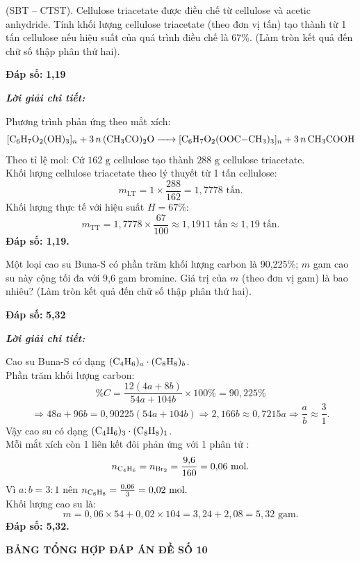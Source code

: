 \documentclass[11pt,a4paper]{article}
\def\loigiai#1{
\par\begingroup\color{blue!80!black}\small
\noindent\textbf{\textit{Lời giải chi tiết:}}\par
#1\par\endgroup}
\begin{document}
\begin{ex}
(SBT -- CTST). Cellulose triacetate được điều chế từ cellulose và acetic anhydride. Tính khối lượng cellulose triacetate (theo đơn vị tấn) tạo thành từ 1 tấn cellulose nếu hiệu suất của quá trình điều chế là 67\%. (Làm tròn kết quả đến chữ số thập phân thứ hai).
\par\noindent\textbf{Đáp số:} \textbf{\color{red}1,19}
\loigiai{
Phương trình phản ứng theo mắt xích:
$$\ce{[C6H7O2(OH)3]_n + 3n (CH3CO)2O -> [C6H7O2(OOC-CH3)3]_n + 3n CH3COOH}$$
Theo tỉ lệ mol: Cứ $162\text{ g}$ cellulose tạo thành $288\text{ g}$ cellulose triacetate.\\
Khối lượng cellulose triacetate theo lý thuyết từ 1 tấn cellulose:
$$m_{\text{LT}} = 1 \times \frac{288}{162} = 1{,}7778\text{ tấn.}$$
Khối lượng thực tế với hiệu suất $H = 67\%$:
$$m_{\text{TT}} = 1{,}7778 \times \frac{67}{100} \approx 1{,}1911\text{ tấn} \approx 1{,}19\text{ tấn.}$$
\textbf{Đáp số: 1,19.}}
\end{ex}

\begin{ex}
Một loại cao su Buna-S có phần trăm khối lượng carbon là 90,225\%; $m$ gam cao su này cộng tối đa với 9,6 gam bromine. Giá trị của $m$ (theo đơn vị gam) là bao nhiêu? (Làm tròn kết quả đến chữ số thập phân thứ hai).
\par\noindent\textbf{Đáp số:} \textbf{\color{red}5,32}
\loigiai{
Cao su Buna-S có dạng $()_a \cdot (\ce{C8H8})_b$.\\
Phần trăm khối lượng carbon:
$$\%C = \frac{12(4a + 8b)}{54a + 104b} \times 100\% = 90{,}225\%$$
$$\Rightarrow 48a + 96b = 0{,}90225(54a + 104b) \Rightarrow 2{,}166b \approx 0{,}7215a \Rightarrow \frac{a}{b} \approx \frac{3}{1}.$$
Vậy cao su có dạng $(\ce{C4H6})_3 \cdot (\ce{C8H8})_1$.\\
Mỗi mắt xích \ce{C4H6} còn 1 liên kết đôi \ce{C=C} phản ứng với 1 phân tử \ce{Br2}:
$$n_{\ce{C4H6}} = n_{\ce{Br2}} = \frac{9{,}6}{160} = 0{,}06\text{ mol.}$$
Vì $a : b = 3 : 1$ nên $n_{\ce{C8H8}} = \frac{0{,}06}{3} = 0{,}02\text{ mol.}$\\
Khối lượng cao su là:
$$m = 0{,}06 \times 54 + 0{,}02 \times 104 = 3{,}24 + 2{,}08 = 5{,}32\text{ gam.}$$
\textbf{Đáp số: 5,32.}}
\end{ex}



\vspace{0.5cm}
\begin{center}
	\textbf{\Large\color{mainGreen}BẢNG TỔNG HỢP ĐÁP ÁN ĐỀ SỐ 10}
\end{center}
\end{document}
